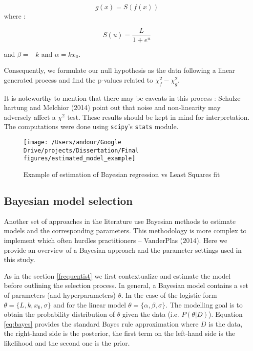 \documentclass[12pt,]{article}
\begin{document}
\begin{equation}
g(x) = S(f(x))
\end{equation}
where :

\begin{equation}
S(u) = \frac{L} {1+e^u}
\end{equation}

and \(\beta = -k\) and \(\alpha = kx_0\).

Consequently, we formulate our null hypothesis as the data following a linear generated process and find the p-values related to \(\chi^2_f - \chi^2_g\).

It is noteworthy to mention that there may be caveats in this process : Schulze-hartung and Melchior (2014) point out that noise and non-linearity may adversely affect a \(\chi^2\) test. These results should be kept in mind for interpretation. The computations were done using \texttt{scipy}'s \texttt{stats} module.

\begin{figure}

{\centering \texttt{[image: /Users/andour/Google Drive/projects/Dissertation/Final figures/estimated\_model\_example]} 

}

\caption{Example of estimation of Bayesian regression vs Least Squares fit}\label{fig:fit}
\end{figure}

\hypertarget{bayesian-model-selection}{%
\subsection{Bayesian model selection}\label{bayesian-model-selection}}

Another set of approaches in the literature use Bayesian methods to estimate models and the corresponding parameters. This methodology is more complex to implement which often hurdles practitioners -- VanderPlas (2014). Here we provide an overview of a Bayesian approach and the parameter settings used in this study.

As in the section \ref{frequentist} we first contextualize and estimate the model before outlining the selection process. In general, a Bayesian model contains a set of parameters (and hyperparameters) \(\theta\). In the case of the logistic form \(\theta = \{L, k, x_0, \sigma\}\) and for the linear model \(\theta = \{\alpha, \beta, \sigma\}\). The modelling goal is to obtain the probability distribution of \(\theta\) given the data (i.e. \(P(\theta|D)\)). Equation \eqref{eq:bayes} provides the standard Bayes rule approximation where \(D\) is the data, the right-hand side is the posterior, the first term on the left-hand side is the likelihood and the second one is the prior.
\end{document}
